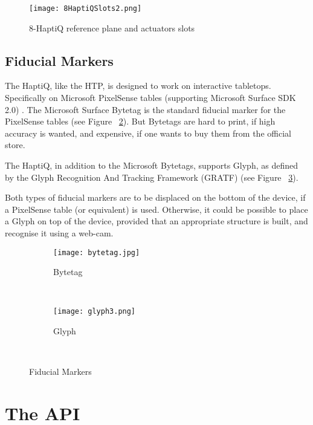 \begin{figure}[H]
  \centering
  \texttt{[image: 8HaptiQSlots2.png]}
  \caption{8-HaptiQ reference plane and actuators slots}
  \label{fig:8haptiqref}
\end{figure}

\subsection{Fiducial Markers}

The HaptiQ, like the HTP, is designed to work on interactive tabletops. Specifically on Microsoft PixelSense tables (supporting Microsoft Surface SDK 2.0) \cite{pixelsense}. The Microsoft Surface Bytetag is the standard fiducial marker for the PixelSense tables (see Figure ~\ref{fig:Bytetag}). But Bytetags are hard to print, if high accuracy is wanted, and expensive, if one wants to buy them from the official store.

The HaptiQ, in addition to the  Microsoft Bytetags, supports Glyph, as defined by the Glyph Recognition And Tracking Framework (GRATF) (see Figure ~\ref{fig:glyph}).

Both types of fiducial markers are to be displaced on the bottom of the device, if a PixelSense table (or equivalent) is used. Otherwise, it could be possible to place a Glyph on top of the device, provided that an appropriate structure is built, and recognise it using a web-cam. 

\begin{figure}[H]
        \centering
        \begin{subfigure}[H]{0.3\textwidth}
                \texttt{[image: bytetag.jpg]}
                \caption{Bytetag}
                \label{fig:Bytetag}
        \end{subfigure}%
        ~ %
        \begin{subfigure}[H]{0.3\textwidth}
                \texttt{[image: glyph3.png]}
                \caption{Glyph}
                \label{fig:glyph}
        \end{subfigure}
        ~ %
        \caption{Fiducial Markers}
        \label{fig:fiducialMarkers}
\end{figure}

\section{The API}

